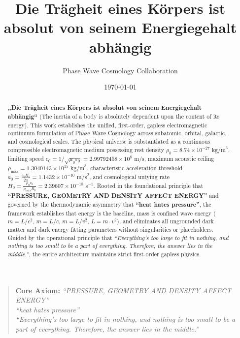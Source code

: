 \documentclass[11pt,a4paper]{article}
\title{Die Trägheit eines Körpers ist absolut von seinem Energiegehalt abhängig}
\author{Phase Wave Cosmology Collaboration}
\date{\today}
\begin{document}
\maketitle

\begin{abstract}
\textbf{„Die Trägheit eines Körpers ist absolut von seinem Energiegehalt abhängig“} (The inertia of a body is absolutely dependent upon the content of its energy). This work establishes the unified, first-order, gapless electromagnetic continuum formulation of Phase Wave Cosmology across subatomic, orbital, galactic, and cosmological scales. The physical universe is substantiated as a continuous compressible electromagnetic medium possessing rest density $\rho_0 = 8.74 \times 10^{-27}\text{ kg/m}^3$, limiting speed $c_0 = 1/\sqrt{\mu_0\varepsilon_0} = 2.99792458 \times 10^8\text{ m/s}$, maximum acoustic ceiling $\rho_{\max} = 1.3040143 \times 10^{15}\text{ kg/m}^3$, characteristic acceleration threshold $a_0 = \frac{c_0 H_0}{2\pi} = 1.1432 \times 10^{-10}\text{ m/s}^2$, and cosmological untying rate $H_0 = \frac{\rho_0 c_0}{\rho_{\max} R_p} = 2.39607 \times 10^{-18}\text{ s}^{-1}$. Rooted in the foundational principle that \textbf{``PRESSURE, GEOMETRY AND DENSITY AFFECT ENERGY''} and governed by the thermodynamic asymmetry that \textbf{``heat hates pressure''}, the framework establishes that energy is the baseline, mass is confined wave energy ($m = L/c^2$, $m = L/c$, $m = L/v^2$, $L = m \cdot v^2$), and eliminates all ungrounded dark matter and dark energy fitting parameters without singularities or placeholders. Guided by the operational principle that \textit{``Everything's too large to fit in nothing, and nothing is too small to be a part of everything. Therefore, the answer lies in the middle.''}, the entire architecture maintains strict first-order gapless physics.
\end{abstract}

\begin{quote}
\centering
\textbf{Core Axiom:} \textit{``PRESSURE, GEOMETRY AND DENSITY AFFECT ENERGY''}\\
\textit{``heat hates pressure''}\\
\textit{``Everything's too large to fit in nothing, and nothing is too small to be a part of everything. Therefore, the answer lies in the middle.''}
\end{quote}


\end{document}
